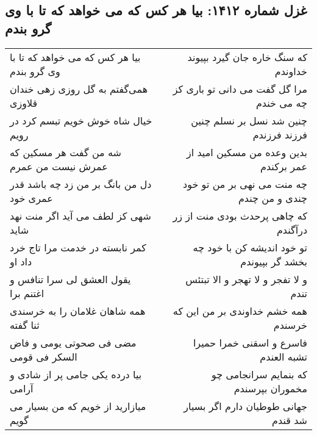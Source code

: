 \begin{center}
\section*{غزل شماره ۱۴۱۲: بیا هر کس که می خواهد که تا با وی گرو بندم}
\label{sec:1412}
\begin{longtable}{l p{0.5cm} r}
بیا هر کس که می خواهد که تا با وی گرو بندم
&&
که سنگ خاره جان گیرد بپیوند خداوندم
\\
همی‌گفتم به گل روزی زهی خندان قلاوزی
&&
مرا گل گفت می دانی تو باری کز چه می خندم
\\
خیال شاه خوش خویم تبسم کرد در رویم
&&
چنین شد نسل بر نسلم چنین فرزند فرزندم
\\
شه من گفت هر مسکین که عمرش نیست من عمرم
&&
بدین وعده من مسکین امید از عمر برکندم
\\
دل من بانگ بر من زد چه باشد قدر عمری خود
&&
چه منت می نهی بر من تو خود چندی و من چندم
\\
شهی کز لطف می آید اگر منت نهد شاید
&&
که چاهی پرحدث بودی منت از زر درآگندم
\\
کمر نابسته در خدمت مرا تاج خرد داد او
&&
تو خود اندیشه کن با خود چه بخشد گر بپیوندم
\\
یقول العشق لی سرا تنافس و اغتنم برا
&&
و لا تفجر و لا تهجر و الا تبتئس تندم
\\
همه شاهان غلامان را به خرسندی ثنا گفته
&&
همه خشم خداوندی بر من این که خرسندم
\\
مضی فی صحوتی یومی و فاض السکر فی قومی
&&
فاسرع و اسقنی خمرا حمیرا تشبه العندم
\\
بیا درده یکی جامی پر از شادی و آرامی
&&
که بنمایم سرانجامی چو مخموران بپرسندم
\\
میازارید از خویم که من بسیار می گویم
&&
جهانی طوطیان دارم اگر بسیار شد قندم
\\
\end{longtable}
\end{center}
